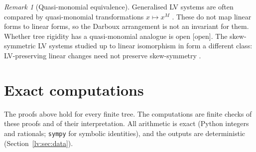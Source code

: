\documentclass[11pt,a4paper]{article}
\theoremstyle{definition}
\theoremstyle{remark}
\newtheorem{remark}[theorem]{Remark}
\newcommand{\lab}[1]{\textsf{[#1]}}
\begin{document}
\begin{remark}[Quasi-monomial equivalence]
\label{lv:rem:quasi}
Generalised LV systems are often compared by quasi-monomial transformations $x\mapsto x^M$ \cite{lv:Brenig1988,lv:HBF1997}. These do not map linear forms to linear forms, so the Darboux arrangement is not an invariant for them. Whether tree rigidity has a quasi-monomial analogue is open \lab{open}. The skew-symmetric LV systems studied up to linear isomorphism in \cite{lv:EKV2022} form a different class: LV-preserving linear changes need not preserve skew-symmetry \cite{lv:KMQ2026}.
\end{remark}

\section{Exact computations}
\label{lv:sec:verification}

The proofs above hold for every finite tree. The computations are finite checks of these proofs and of their interpretation. All arithmetic is exact (Python integers and rationals; \texttt{sympy} for symbolic identities), and the outputs are deterministic (Section~\ref{lv:sec:data}).
\end{document}
